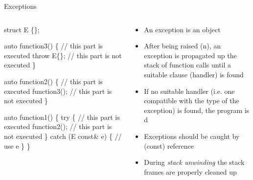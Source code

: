 \begin{frame}[fragile]{Exceptions \insertcontinuationtext}
  \begin{columns}

    \begin{column}{.5\textwidth}
      \begin{codeblock}
struct E \{\};

auto function3() \{
  \ddd // this part is executed
  \alert{throw} E\{\};
  \ddd // this part is not executed
\}

auto function2() \{
  \ddd // this part is executed
  function3();
  \ddd // this part is not executed
\}

auto function1() \{
  \alert{try} \{
    \ddd // this part is executed
    function2();
    \ddd // this part is not executed
  \} \alert{catch} (E const& e) \{
    \ddd // use e
  \}
\}\end{codeblock}
    \end{column}

    \begin{column}{.5\textwidth}
      \begin{itemize}[<+->]
      \item An exception is an object
      \item After being raised (n), an exception is propagated up the stack
        of function calls until a suitable  clause (handler) is
        found
      \item If no suitable handler (i.e. one compatible with the type of the
        exception) is found, the program is d
      \item Exceptions should be caught by (const) reference
      \item During \textit{stack unwinding} the stack frames are properly
        cleaned up
      \end{itemize}
    \end{column}

  \end{columns}

\end{frame}

